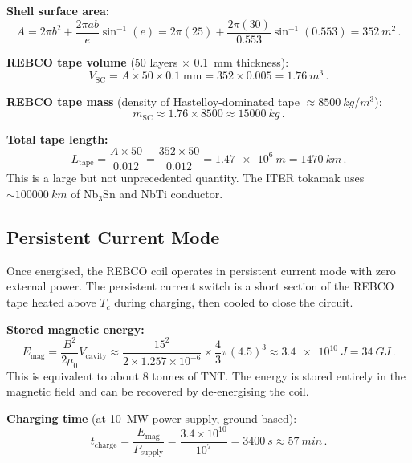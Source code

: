 \documentclass[11pt,a4paper]{article}
\begin{document}
\textbf{Shell surface area:}
\begin{equation}
A = 2\pi b^2 + \frac{2\pi ab}{e}\sin^{-1}(e)
= 2\pi(25) + \frac{2\pi(30)}{0.553}\sin^{-1}(0.553)
= \SI{352}{m^2}\,.
\end{equation}

\textbf{REBCO tape volume} (50 layers $\times$ \SI{0.1}{mm} thickness):
\begin{equation}
V_{\mathrm{SC}} = A \times 50 \times 0.1\;\mathrm{mm} = 352 \times 0.005 = \SI{1.76}{m^3}\,.
\end{equation}

\textbf{REBCO tape mass} (density of Hastelloy-dominated tape $\approx \SI{8500}{kg/m^3}$):
\begin{equation}
m_{\mathrm{SC}} \approx 1.76 \times 8500 \approx \SI{15000}{kg}\,.
\end{equation}

\textbf{Total tape length:}
\begin{equation}
L_{\mathrm{tape}} = \frac{A \times 50}{0.012} = \frac{352 \times 50}{0.012}
= \SI{1.47e6}{m} = \SI{1470}{km}\,.
\end{equation}
This is a large but not unprecedented quantity. The ITER tokamak uses
$\sim\!\SI{100000}{km}$ of Nb$_3$Sn and NbTi conductor.

\subsection{Persistent Current Mode}

Once energised, the REBCO coil operates in persistent current mode with
zero external power. The persistent current switch is a short section of
the REBCO tape heated above $T_c$ during charging, then cooled to close
the circuit.

\textbf{Stored magnetic energy:}
\begin{equation}
E_{\mathrm{mag}} = \frac{B^2}{2\mu_0} V_{\mathrm{cavity}}
\approx \frac{15^2}{2 \times 1.257 \times 10^{-6}} \times \frac{4}{3}\pi(4.5)^3
\approx \SI{3.4e10}{J} = \SI{34}{GJ}\,.
\end{equation}
This is equivalent to about 8 tonnes of TNT. The energy is stored entirely
in the magnetic field and can be recovered by de-energising the coil.

\textbf{Charging time} (at \SI{10}{MW} power supply, ground-based):
\begin{equation}
t_{\mathrm{charge}} = \frac{E_{\mathrm{mag}}}{P_{\mathrm{supply}}}
= \frac{3.4 \times 10^{10}}{10^7} = \SI{3400}{s} \approx \SI{57}{min}\,.
\end{equation}
\end{document}
